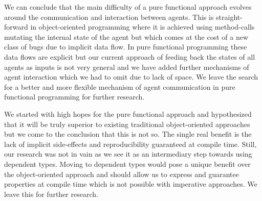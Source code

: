 We can conclude that the main difficulty of a pure functional approach evolves around the communication and interaction between agents. This is straight-forward in object-oriented programming where it is achieved using method-calls mutating the internal state of the agent but which comes at the cost of a new class of bugs due to implicit data flow. In pure functional programming these data flows are explicit but our current approach of feeding back the states of all agents as inputs is not very general and we have added further mechanisms of agent interaction which we had to omit due to lack of space. We leave the search for a better and more flexible mechanism of agent communication in pure functional programming for further research.

\begin{comment}
Our current solution to the problem is the data-flow mechanism as implemented in section \ref{sec:step3_dataflow}. We have to admit that it is rather ad-hoc and may need some refinement and generalisation, also it is unclear if there are not better/more flexible mechanisms of agent communication and interaction in pure functional programming. We leave this for further research.
\end{comment}

We started with high hopes for the pure functional approach and hypothesized that it will be truly superior to existing traditional object-oriented approaches but we come to the conclusion that this is not so. The single real benefit is the lack of implicit side-effects and reproducibility guaranteed at compile time. Still, our research was not in vain as we see it as an intermediary step towards using dependent types. Moving to dependent types would pose a unique benefit over the object-oriented approach and should allow us to express and guarantee properties at compile time which is not possible with imperative approaches. We leave this for further research.